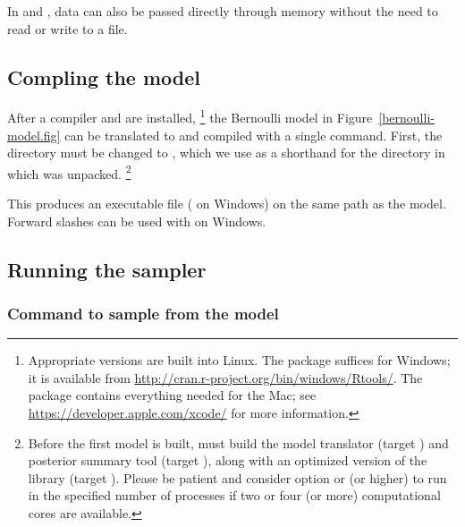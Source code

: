 \documentclass[article]{jss}
\begin{document}
In  and , data can also be passed directly
through memory without the need to read or write to a file.  

\subsection{Compling the model}

After a  compiler and  are installed,%
%
\footnote{Appropriate versions are built into Linux. The 
  package suffices for Windows; it is available from
  \url{http://cran.r-project.org/bin/windows/Rtools/}.  The
   package contains everything needed for the Mac; see
  \url{https://developer.apple.com/xcode/} for more information.}
%
the Bernoulli model in Figure~\ref{bernoulli-model.fig} can be
translated to  and compiled with a single command.
First, the directory must be changed to , which we use as
a shorthand for the directory in which  was unpacked.%
%
\footnote{Before the first model is built,  must build the
  model translator (target ) and posterior summary tool
  (target ), along with an optimized version of the
   library (target ).  Please be patient
  and consider  option  or  (or higher)
  to run in the specified number of processes if two or four (or more)
  computational cores are available.}
%
\begin{CodeChunk}
\end{CodeChunk}
%
This produces an executable file 
( on Windows) on the same path as the model.
Forward slashes can be used with  on Windows.

\subsection{Running the sampler}

\subsubsection{Command to sample from the model}
\end{document}
